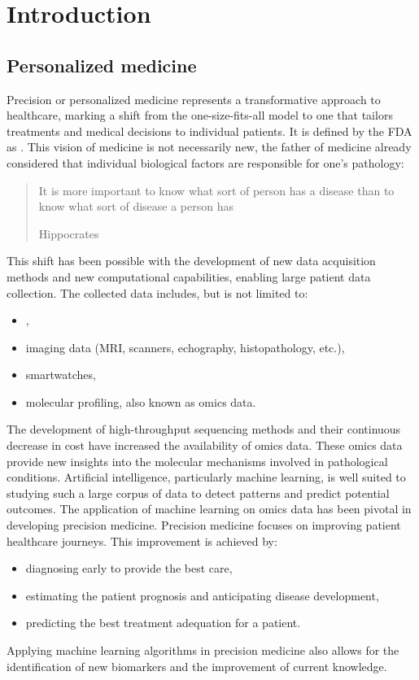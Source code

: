 \documentclass[../main.tex]{subfiles}
\begin{document}

\chapter{Introduction}
\minitoc

\section{Personalized medicine}
	Precision or personalized medicine represents a transformative approach to healthcare, marking a shift from the one-size-fits-all model to one that tailors treatments and medical decisions to individual patients.
	It is defined by the FDA as .
	This vision of medicine is not necessarily new, the father of medicine already considered that individual biological factors are responsible for one's pathology: \blockquote[Hippocrates][.]{It is more important to know what sort of person has a disease than to know what sort of disease a person has}.
	This shift has been possible with the development of new data acquisition methods and new computational capabilities, enabling large patient data collection.
	The collected data includes, but is not limited to:
	\begin{itemize}[nosep]
		\item {},
		\item imaging data (MRI, scanners, echography, histopathology, etc.),
		\item smartwatches,
		\item molecular profiling, also known as omics data.
	\end{itemize}
	The development of high-throughput sequencing methods and their continuous decrease in cost have increased the availability of omics data.
	These omics data provide new insights into the molecular mechanisms involved in pathological conditions.
	Artificial intelligence, particularly machine learning, is well suited to studying such a large corpus of data to detect patterns and predict potential outcomes.
	The application of machine learning on omics data has been pivotal in developing precision medicine.
	Precision medicine focuses on improving patient healthcare journeys.
	This improvement is achieved by:
	\begin{itemize}[nosep]
		\item diagnosing early to provide the best care,
		\item estimating the patient prognosis and anticipating disease development,
		\item predicting the best treatment adequation for a patient.
	\end{itemize}
	Applying machine learning algorithms in precision medicine also allows for the identification of new biomarkers and the improvement of current knowledge.
\end{document}

